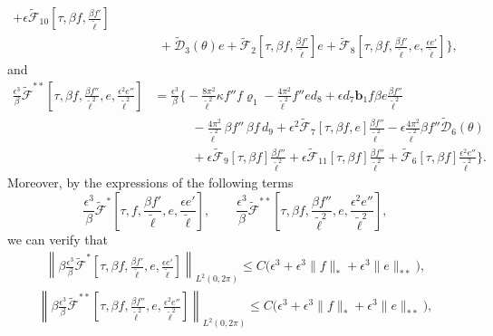 \documentclass[10pt, reqno]{amsart}
\numberwithin{equation}{section}
\theoremstyle{definition}
\begin{document}
{\begin{align*}
 + \epsilon\tilde{\mathcal F}_{10}\left[\tau, \beta f, \frac{\beta {f}'}{\tilde\ell}\right]
\nonumber\\[2mm]
&\qquad \quad
+ \tilde{\mathcal D}_3 (\theta) e
+ \tilde{\mathcal F}_2\left[\tau, \beta f, \frac{\beta f'}{\tilde\ell} \right] e
+ \tilde{\mathcal F}_{8}\left[\tau, \beta f, \frac{\beta {f}'}{\tilde\ell}, e, \frac{\epsilon e'}{\tilde\ell}\right]
\Bigg\},
\end{align*}
and
\begin{align*}
 \frac{\epsilon^3}{\beta}\tilde{\mathcal F}^{**} \left[\tau, \beta f, \frac{\beta f''}{\tilde\ell^2}, e, \frac{\epsilon^2 e''}{\tilde\ell^2}\right]
& =\frac{\epsilon^3}{\beta}
\Bigg\{ - \frac{8\pi^2}{{\tilde\ell}^2} \kappa f''f \varrho_1
- \frac{4\pi^2}{{\tilde\ell}^2}f'' e d_8 + \epsilon d_7{\mathbf b}_1 f \beta e\frac{\beta f''}{\tilde\ell^2}
\nonumber\\[2mm]
& \qquad \quad
- \frac{4\pi^2}{{\tilde\ell}^2} \,\beta f''\,\beta f\,  d_9
+ \epsilon^2 \tilde{\mathcal F}_{7}\left[\tau, \beta f, e \right] \frac{\beta f''}{\tilde\ell^2}
-\epsilon \frac{4\pi^2}{{\tilde\ell}^2} \beta f'' \tilde{\mathcal D}_6(\theta)
 \nonumber\\[2mm]
&  \qquad \quad
 + \epsilon\tilde{\mathcal F}_{9}\left[\tau, \beta f \right] \frac{\beta f''} {\tilde\ell^2}
 + \epsilon\tilde{\mathcal F}_{11}\left[\tau, \beta f \right] \frac{\beta f''} {\tilde\ell^2}
 + \tilde{\mathcal F}_{6}\left[\tau, \beta f \right] \frac{\epsilon^2 e''}{\tilde\ell^2}
 \Bigg\}.
\end{align*}
Moreover, by the expressions of the following terms
$$
\frac{\epsilon^3}{\beta}\tilde{\mathcal F}^{*} \left[\tau, f, \frac{\beta {f}'}{\tilde\ell}, e, \frac{\epsilon e'}{\tilde\ell}\right],
\qquad
\frac{\epsilon^3}{\beta}\tilde{\mathcal F}^{**} \left[\tau, \beta f, \frac{\beta f''}{\tilde\ell^2}, e, \frac{\epsilon^2 e''}{\tilde\ell^2}\right],
$$
we can verify that
\begin{align*}
\left\|\beta \frac{\epsilon^3}{\beta}\tilde{\mathcal F}^{*} \left[\tau, \beta f, \frac{\beta {f}'}{\tilde\ell}, e, \frac{\epsilon e'}{\tilde\ell}\right] \right\|_{L^2(0, 2\pi)}
\le C \big(\epsilon^3+ \epsilon^3 \|f\|_* +\epsilon^3 \|e\|_{**} \big),
\end{align*}
\begin{align*}
\left\| \beta \frac{\epsilon^3}{\beta}\tilde{\mathcal F}^{**} \left[\tau, \beta f, \frac{\beta f''}{\tilde\ell^2}, e, \frac{\epsilon^2 e''}{\tilde\ell^2}\right] \right\|_{L^2(0, 2\pi)} \le C \big(\epsilon^3+ \epsilon^3 \|f\|_* + \epsilon^3 \|e\|_{**} \big),

\end{align*}}
\end{document}
